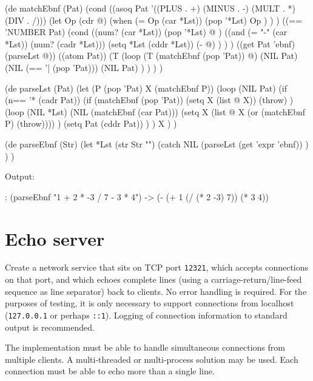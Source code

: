 \begin{wideverbatim}

(de matchEbnf (Pat)
   (cond
      ((asoq Pat '((PLUS . +) (MINUS . -) (MULT . *) (DIV . /)))
         (let Op (cdr @)
            (when (= Op (car *Lst))
               (pop '*Lst)
               Op ) ) )
      ((== 'NUMBER Pat)
         (cond
            ((num? (car *Lst))
               (pop '*Lst)
               @ )
            ((and (= "-" (car *Lst)) (num? (cadr *Lst)))
               (setq *Lst (cddr *Lst))
               (- @) ) ) )
      ((get Pat 'ebnf) (parseLst @))
      ((atom Pat))
      (T
         (loop
            (T (matchEbnf (pop 'Pat)) @)
            (NIL Pat)
            (NIL (== '| (pop 'Pat)))
            (NIL Pat) ) ) ) )


(de parseLst (Pat)
   (let (P (pop 'Pat)  X (matchEbnf P))
      (loop
         (NIL Pat)
         (if (n== '* (cadr Pat))
            (if (matchEbnf (pop 'Pat))
               (setq X (list @ X))
               (throw) )
            (loop
               (NIL *Lst)
               (NIL (matchEbnf (car Pat)))
               (setq X (list @ X (or (matchEbnf P) (throw)))) )
            (setq Pat (cddr Pat)) ) )
      X ) )

(de parseEbnf (Str)
   (let *Lst (str Str "")
      (catch NIL
         (parseLst (get 'expr 'ebnf)) ) ) )

Output:

: (parseEbnf "1 + 2 * -3 / 7 - 3 * 4")
-> (- (+ 1 (/ (* 2 -3) 7)) (* 3 4))


\end{wideverbatim}


\pagebreak{}
\section*{Echo server}

Create a network service that sits on TCP port \texttt{12321}, which
accepts connections on that port, and which echoes complete lines (using
a carriage-return/line-feed sequence as line separator) back to clients.
No error handling is required. For the purposes of testing, it is only
necessary to support connections from localhost (\texttt{127.0.0.1} or
perhaps \texttt{::1}). Logging of connection information to standard
output is recommended.

The implementation must be able to handle simultaneous connections from
multiple clients. A multi-threaded or multi-process solution may be
used. Each connection must be able to echo more than a single line.

